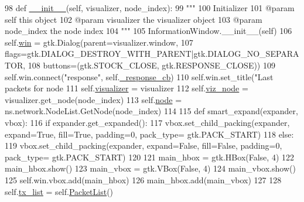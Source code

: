 \begin{DoxyCode}
98     \textcolor{keyword}{def }\hyperlink{classshow__last__packets_1_1ShowLastPackets_aea1733d85857720dee3ff00609c7e521}{\_\_init\_\_}(self, visualizer, node\_index):
99         \textcolor{stringliteral}{"""}
100 \textcolor{stringliteral}{        Initializer}
101 \textcolor{stringliteral}{        @param self this object}
102 \textcolor{stringliteral}{        @param visualizer the visualizer object}
103 \textcolor{stringliteral}{        @param node\_index the node index}
104 \textcolor{stringliteral}{        """}
105         InformationWindow.\_\_init\_\_(self)
106         self.\hyperlink{classshow__last__packets_1_1ShowLastPackets_a6a9100fa3cf84db3e07a20e257adb254}{win} = gtk.Dialog(parent=visualizer.window,
107                               flags=gtk.DIALOG\_DESTROY\_WITH\_PARENT|gtk.DIALOG\_NO\_SEPARATOR,
108                               buttons=(gtk.STOCK\_CLOSE, gtk.RESPONSE\_CLOSE))
109         self.win.connect(\textcolor{stringliteral}{"response"}, self.\hyperlink{classshow__last__packets_1_1ShowLastPackets_a139b1805186f1c85f3a71331948a08dc}{\_response\_cb})
110         self.win.set\_title(\textcolor{stringliteral}{"Last packets for node %
111         self.\hyperlink{classshow__last__packets_1_1ShowLastPackets_aafe3eb5d6509654089b644b42c63f177}{visualizer} = visualizer
112         self.\hyperlink{classshow__last__packets_1_1ShowLastPackets_a7bef1901e6a888f94e936a21eb53a46b}{viz\_node} = visualizer.get\_node(node\_index)
113         self.\hyperlink{classshow__last__packets_1_1ShowLastPackets_a0c618af7788119c3c1c4927a512f3558}{node} = ns.network.NodeList.GetNode(node\_index)
114 
115         \textcolor{keyword}{def }smart\_expand(expander, vbox):
116             \textcolor{keywordflow}{if} expander.get\_expanded():
117                 vbox.set\_child\_packing(expander, expand=\textcolor{keyword}{True}, fill=\textcolor{keyword}{True}, padding=0, pack\_type=
      gtk.PACK\_START)
118             \textcolor{keywordflow}{else}:
119                 vbox.set\_child\_packing(expander, expand=\textcolor{keyword}{False}, fill=\textcolor{keyword}{False}, padding=0, pack\_type=
      gtk.PACK\_START)
120 
121         main\_hbox = gtk.HBox(\textcolor{keyword}{False}, 4)
122         main\_hbox.show()
123         main\_vbox = gtk.VBox(\textcolor{keyword}{False}, 4)
124         main\_vbox.show()
125         self.win.vbox.add(main\_hbox)
126         main\_hbox.add(main\_vbox)
127         
128         self.\hyperlink{classshow__last__packets_1_1ShowLastPackets_a20a0ef63b8cf999d312e67d61782bced}{tx\_list} = self.\hyperlink{classshow__last__packets_1_1ShowLastPackets_1_1PacketList}{PacketList}()
}
\end{DoxyCode}
